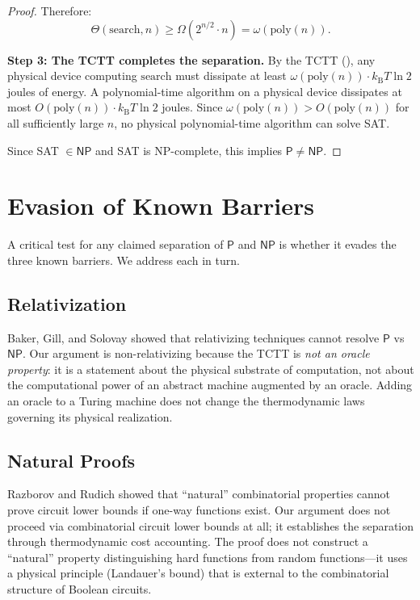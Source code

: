\documentclass[12pt, a4paper]{article}
\theoremstyle{plain}
\theoremstyle{definition}
\theoremstyle{remark}
\newcommand{\Pc}{\mathsf{P}}
\newcommand{\NPc}{\mathsf{NP}}
\newcommand{\poly}{\mathrm{poly}}
\newcommand{\kB}{k_{\mathrm{B}}}
\begin{document}
\begin{proof}
  Therefore:
  \begin{equation}\label{eq:search_cost}
    \Theta(\text{search}, n) \geq \Omega(2^{n/2} \cdot n) = \omega(\poly(n)).
  \end{equation}

  \textbf{Step 3: The TCTT completes the separation.}
  By the TCTT (), any physical device computing
  $\text{search}$ must dissipate at least
  $\omega(\poly(n)) \cdot \kB T \ln 2$ joules of energy.
  A polynomial-time algorithm on a physical device dissipates at most
  $O(\poly(n)) \cdot \kB T \ln 2$ joules. Since
  $\omega(\poly(n)) > O(\poly(n))$ for all sufficiently large $n$,
  no physical polynomial-time algorithm can solve SAT.

  Since SAT $\in \NPc$ and SAT is NP-complete, this implies
  $\Pc \neq \NPc$.
\end{proof}

\section{Evasion of Known Barriers}\label{sec:barriers}

A critical test for any claimed separation of $\Pc$ and $\NPc$ is whether
it evades the three known barriers. We address each in turn.

\subsection{Relativization}

Baker, Gill, and Solovay \citep{BakerGillSolovay1975} showed that
relativizing techniques cannot resolve $\Pc$ vs $\NPc$. Our argument is
non-relativizing because the TCTT is \emph{not an oracle property}: it
is a statement about the physical substrate of computation, not about
the computational power of an abstract machine augmented by an oracle.
Adding an oracle to a Turing machine does not change the thermodynamic
laws governing its physical realization.

\subsection{Natural Proofs}

Razborov and Rudich \citep{RazborovRudich1997} showed that ``natural''
combinatorial properties cannot prove circuit lower bounds if one-way
functions exist. Our argument does not proceed via combinatorial circuit
lower bounds at all; it establishes the separation through thermodynamic
cost accounting. The proof does not construct a ``natural'' property
distinguishing hard functions from random functions---it uses a physical
principle (Landauer's bound) that is external to the combinatorial structure
of Boolean circuits.
\end{document}
